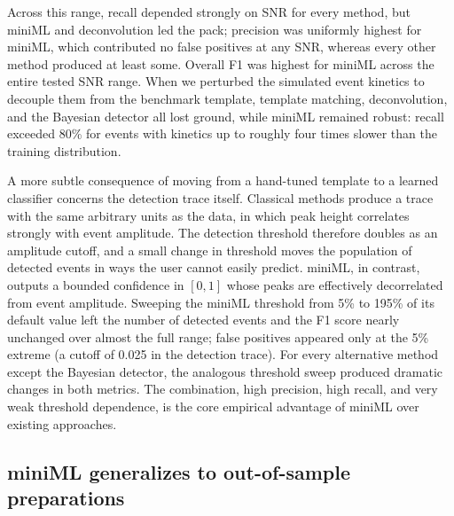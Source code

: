 \documentclass[11pt]{article}
\begin{document}
Across this range, recall depended strongly on SNR for every method, but
miniML and deconvolution led the pack; precision was uniformly highest for
miniML, which contributed no false positives at any SNR, whereas every other
method produced at least some. Overall F1 was highest for miniML across the
entire tested SNR range. When we perturbed the simulated event kinetics to
decouple them from the benchmark template, template matching, deconvolution,
and the Bayesian detector all lost ground, while miniML remained robust:
recall exceeded 80\% for events with kinetics up to roughly four times
slower than the training distribution.

A more subtle consequence of moving from a hand-tuned template to a learned
classifier concerns the detection trace itself. Classical methods produce a
trace with the same arbitrary units as the data, in which peak height
correlates strongly with event amplitude. The detection threshold therefore
doubles as an amplitude cutoff, and a small change in threshold moves the
population of detected events in ways the user cannot easily predict.
miniML, in contrast, outputs a bounded confidence in $[0,1]$ whose peaks are
effectively decorrelated from event amplitude. Sweeping the miniML threshold
from 5\% to 195\% of its default value left the number of detected events
and the F1 score nearly unchanged over almost the full range; false
positives appeared only at the 5\% extreme (a cutoff of 0.025 in the
detection trace). For every alternative method except the Bayesian detector,
the analogous threshold sweep produced dramatic changes in both metrics.
The combination, high precision, high recall, and very weak threshold
dependence, is the core empirical advantage of miniML over existing
approaches.

\subsection{miniML generalizes to out-of-sample preparations}
\end{document}
